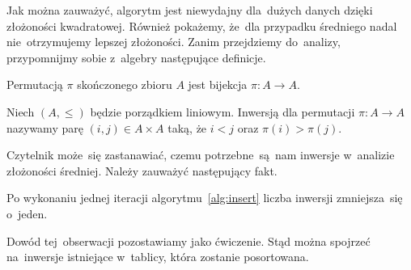 Jak można zauważyć, algorytm jest niewydajny dla~dużych
danych dzięki złożoności kwadratowej. Również pokażemy,
że~dla przypadku średniego nadal nie~otrzymujemy
lepszej złożoności. Zanim przejdziemy do~analizy,
przypomnijmy sobie z~algebry następujące definicje.

\begin{definition}
    Permutacją \( \pi \) skończonego zbioru \( A \)
    jest bijekcja \( \pi : A \to A \).
\end{definition}

\begin{definition}
    Niech \( (A, \le) \) będzie porządkiem liniowym.
    Inwersją dla permutacji \( \pi : A \to A \) 
    nazywamy parę \( (i, j) \in A \times A \)
    taką, że \( i < j \) oraz \( \pi(i) > \pi(j) \).
\end{definition}

Czytelnik może~się zastanawiać, czemu potrzebne~są~nam 
inwersje w~analizie złożoności średniej.
Należy zauważyć następujący fakt.
\begin{fact}
    Po wykonaniu jednej iteracji algorytmu~\ref{alg:insert} 
    liczba inwersji zmniejsza~się o~jeden.
\end{fact}      
Dowód tej~obserwacji pozostawiamy jako ćwiczenie.
Stąd można spojrzeć na~inwersje istniejące w~tablicy,
która zostanie posortowana.

